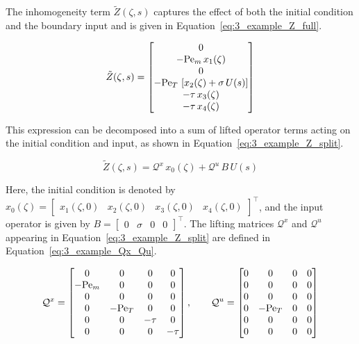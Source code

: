 The inhomogeneity term $\tilde{Z}(\zeta, s)$ captures the effect of both the initial condition and the boundary input and is given in Equation~\eqref{eq:3_example_Z_full}.

\begin{equation} \label{eq:3_example_Z_full}
\tilde{Z}(\zeta, s) =
\begin{bmatrix}
0 \\
-{\rm Pe}_m\, x_1(\zeta) \\
0 \\
-{\rm Pe}_T\, \left[ x_2(\zeta) + \sigma\, U(s) \right] \\
-\tau\, x_3(\zeta) \\
-\tau\, x_4(\zeta)
\end{bmatrix}
\end{equation}

This expression can be decomposed into a sum of lifted operator terms acting on the initial condition and input, as shown in Equation~\eqref{eq:3_example_Z_split}.

\begin{equation} \label{eq:3_example_Z_split}
\tilde{Z}(\zeta, s) = \mathcal{Q}^x\, x_0(\zeta) + \mathcal{Q}^u\, B\, U(s)
\end{equation}

Here, the initial condition is denoted by $x_0(\zeta) = \begin{bmatrix} x_1(\zeta, 0) & x_2(\zeta, 0) & x_3(\zeta, 0) & x_4(\zeta, 0) \end{bmatrix}^\top$, and the input operator is given by $B = \begin{bmatrix} 0 & \sigma & 0 & 0 \end{bmatrix}^\top$. The lifting matrices $\mathcal{Q}^x$ and $\mathcal{Q}^u$ appearing in Equation~\eqref{eq:3_example_Z_split} are defined in Equation~\eqref{eq:3_example_Qx_Qu}.

\begin{equation} \label{eq:3_example_Qx_Qu}
\mathcal{Q}^x =
\begin{bmatrix}
0 & 0 & 0 & 0 \\
-{\rm Pe}_m & 0 & 0 & 0 \\
0 & 0 & 0 & 0 \\
0 & -{\rm Pe}_T & 0 & 0 \\
0 & 0 & -\tau & 0 \\
0 & 0 & 0 & -\tau
\end{bmatrix}, \qquad
\mathcal{Q}^u =
\begin{bmatrix}
0 & 0 & 0 & 0 \\
0 & 0 & 0 & 0 \\
0 & 0 & 0 & 0 \\
0 & -{\rm Pe}_T & 0 & 0 \\
0 & 0 & 0 & 0 \\
0 & 0 & 0 & 0
\end{bmatrix}
\end{equation}

